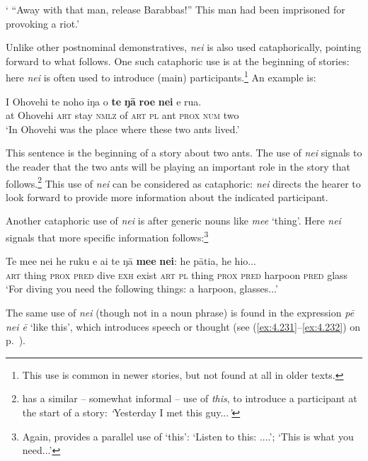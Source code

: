 \glt
‘ “Away with that man, release Barabbas!” This man had been imprisoned for provoking a riot.’ \textstyleExampleref{[Luke 23:19]}
\z

Unlike other postnominal demonstratives, \textit{nei} is also used cataphorically, pointing forward to what follows. One such cataphoric use is at the beginning of stories: here \textit{nei} is often used to introduce (main) participants.\footnote{\label{fn:220}This use is common in newer stories, but not found at all in older texts.} An example is:

\ea\label{ex:4.210}
\gll {\ꞌ}I {\ꞌ}Ohovehi te noho iŋa o \textbf{te} \textbf{ŋā} \textbf{roe} \textbf{nei} e rua. \\
at Ohovehi \textsc{art} stay \textsc{nmlz} of \textsc{art} \textsc{pl} ant \textsc{prox} \textsc{num} two \\

\glt
‘In Ohovehi was the place where these two ants lived.’ \textstyleExampleref{[R214.001]} 
\z

This sentence is the beginning of a story about two ants. The use of \textit{nei} signals to the reader that the two ants will be playing an important role in the story that follows.\footnote{\label{fn:221} has a similar – somewhat informal – use of \textit{this}, to introduce a participant at the start of a story: \textit{‘}Yesterday I met this guy...\textit{’}} This use of \textit{nei} can be considered as cataphoric: \textit{nei} directs the hearer to look forward to provide more information about the indicated participant. 

Another cataphoric use of \textit{nei} is after generic nouns like \textit{me{\ꞌ}e} ‘thing’. Here \textit{nei} signals that more specific information follows:\footnote{\label{fn:222}Again,  provides a parallel use of ‘this’: ‘Listen to this: ....’; ‘This is what you need...’} 

\ea\label{ex:4.211}
\gll Te me{\ꞌ}e nei he ruku e ai te ŋā \textbf{me{\ꞌ}e} \textbf{nei}: he pātia, he hi{\ꞌ}o... \\
\textsc{art} thing \textsc{prox} \textsc{pred} dive \textsc{exh} exist \textsc{art} \textsc{pl} thing \textsc{prox} \textsc{pred} harpoon \textsc{pred} glass \\

\glt
‘For diving you need the following things: a harpoon, glasses...’ \textstyleExampleref{[R360.001]} 
\z

The same use of \textit{nei} (though not in a noun phrase) is found in the expression \textit{pē nei ē} ‘like this’, which introduces speech or thought (see (\ref{ex:4.231}–\ref{ex:4.232}) on p.~\pageref{ex:4.231}).

